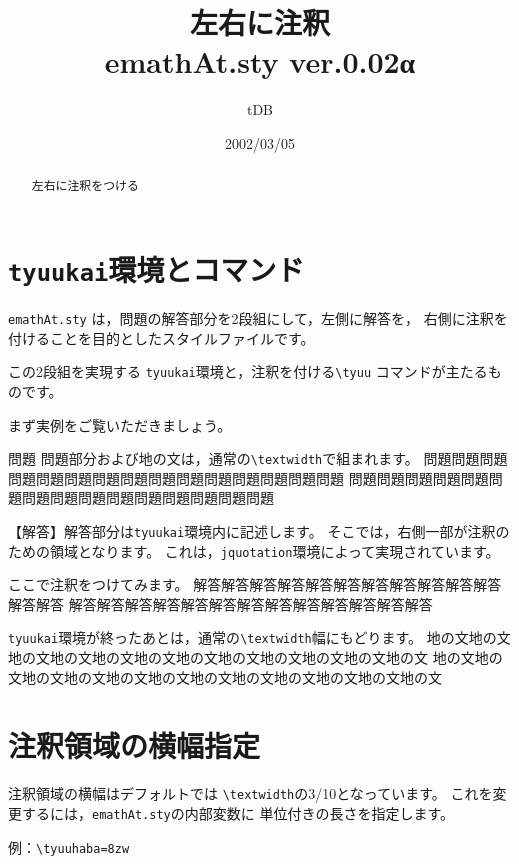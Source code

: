 \documentclass[a4j,fleqn]{jarticle}
\begin{document}
\title{左右に注釈\\
emathAt.sty {\normalsize ver.0.02α}}
\author{tDB}
\date{2002/03/05}

\maketitle\thispagestyle{empty}
\begin{abstract}%
\centerline{左右に注釈をつける}
\end{abstract}

\tableofcontents

\pagebreak
{}

\section{\texttt{tyuukai}環境とコマンド}
\verb+emathAt.sty+ は，問題の解答部分を2段組にして，左側に解答を，
右側に注釈を付けることを目的としたスタイルファイルです。

この2段組を実現する \verb+tyuukai+環境と，注釈を付ける\verb+\tyuu+
コマンドが主たるものです。

まず実例をご覧いただきましょう。

\begin{itembox}{問題}
問題部分および地の文は，通常の\verb+\textwidth+で組まれます。
問題問題問題問題問題問題問題問題問題問題問題問題問題問題問題
問題問題問題問題問題問題問題問題問題問題問題問題問題問題問題
\end{itembox}
\begin{tyuukai}
【解答】解答部分は\verb+tyuukai+環境内に記述します。
そこでは，右側一部が注釈のための領域となります。
これは，\verb+jquotation+環境によって実現されています。

ここで注釈をつけてみます。
解答解答解答解答解答解答解答解答解答解答解答解答解答
解答解答解答解答解答解答解答解答解答解答解答解答解答
\end{tyuukai}

\verb+tyuukai+環境が終ったあとは，通常の\verb+\textwidth+幅にもどります。
地の文地の文地の文地の文地の文地の文地の文地の文地の文地の文地の文地の文
地の文地の文地の文地の文地の文地の文地の文地の文地の文地の文地の文地の文
\clearpage

\section{注釈領域の横幅指定}
注釈領域の横幅はデフォルトでは \verb+\textwidth+の3/10となっています。
これを変更するには，\verb+emathAt.sty+の内部変数に
単位付きの長さを指定します。
\begin{jquote}
 例：\verb+\tyuuhaba=8zw+
\end{jquote}
\end{document}

